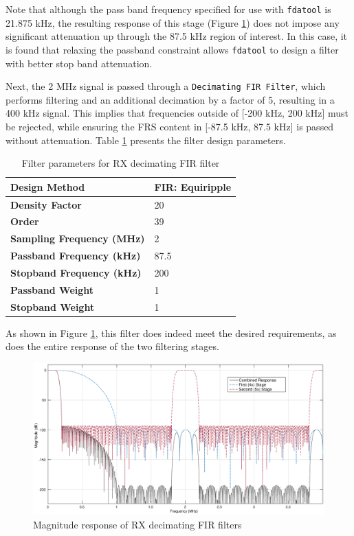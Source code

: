 Note that although the pass band frequency specified for use with
\texttt{fdatool} is 21.875 kHz, the resulting response of this stage (Figure
\ref{fig:rx_firs}) does not impose any significant attenuation up through
the 87.5 kHz region of interest. In this case, it is found that relaxing the
passband constraint allows \texttt{fdatool} to design a filter with better
stop band attenuation.

Next, the 2 MHz signal is passed through a \texttt{Decimating FIR Filter},
which performs filtering and an additional decimation by a factor of 5,
resulting in a 400 kHz signal. This implies that frequencies outside of
[-200 kHz, 200 kHz] must be rejected, while ensuring the \ac{FRS} content in
[-87.5 kHz, 87.5 kHz] is passed without attenuation. Table \ref{tab:rx_dec_fir}
presents the filter design parameters.

\begin{table}[h]
  \centering
  \caption{Filter parameters for RX decimating FIR filter}
  \label{tab:rx_dec_fir}
  \footnotesize
  \begin{tabular} {|l|l|}
    \hline
    \textbf{Design Method}              & FIR: Equiripple \\ \hline
    \textbf{Density Factor}             & 20              \\ \hline
    \textbf{Order}                      & 39              \\ \hline
    \textbf{Sampling Frequency (MHz)}   & 2               \\ \hline
    \textbf{Passband Frequency (kHz)}   & 87.5            \\ \hline
    \textbf{Stopband Frequency (kHz)}   & 200             \\ \hline
    \textbf{Passband Weight}            & 1               \\ \hline
    \textbf{Stopband Weight}            & 1               \\ \hline
  \end{tabular}
\end{table}

As shown in Figure \ref{fig:rx_firs}, this filter does indeed meet the
desired requirements, as does the entire response of the two filtering stages.

\begin{figure}[h!]
  \centering
  \includegraphics[width=6.5in]{images/frs/filter/rx/dec-firs.eps}
  \caption{Magnitude response of RX decimating FIR filters}
  \label{fig:rx_firs}
\end{figure}

